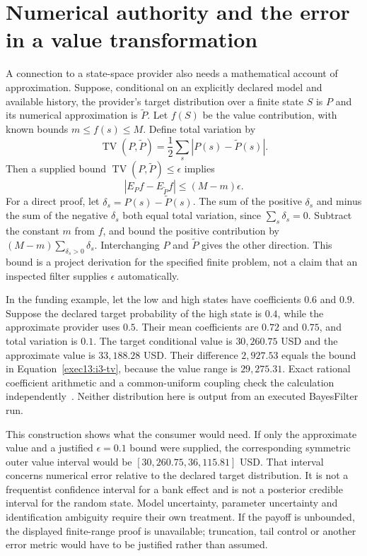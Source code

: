 \section{Numerical authority and the error in a value transformation}

A connection to a state-space provider also needs a mathematical account of
approximation. Suppose, conditional on an explicitly declared model and
available history, the provider's target distribution over a finite state
$S$ is $P$ and its numerical approximation is $\widetilde P$. Let $f(S)$
be the value contribution, with known bounds $m\leq f(s)\leq M$.
Define total variation by
\[
 \operatorname{TV}(P,\widetilde P)
     =\frac12\sum_s|P(s)-\widetilde P(s)|.
\]
Then a supplied bound $\operatorname{TV}(P,\widetilde P)\leq\epsilon$
implies
\begin{equation}
 |E_Pf-E_{\widetilde P}f|\leq(M-m)\epsilon.
 \label{exec13:i3-tv}
\end{equation}
For a direct proof, let $\delta_s=P(s)-\widetilde P(s)$. The sum of the
positive $\delta_s$ and minus the sum of the negative $\delta_s$ both
equal total variation, since $\sum_s\delta_s=0$. Subtract the constant
$m$ from $f$, and bound the positive contribution by
$(M-m)\sum_{\delta_s>0}\delta_s$. Interchanging $P$ and $\widetilde P$
gives the other direction. This bound is a project derivation for the
specified finite problem, not a claim that an inspected filter supplies
$\epsilon$ automatically.

In the funding example, let the low and high states have coefficients
$0.6$ and $0.9$. Suppose the declared target probability of the high state
is $0.4$, while the approximate provider uses $0.5$. Their mean
coefficients are $0.72$ and $0.75$, and total variation is $0.1$.
The target conditional value is $30{,}260.75$ USD and the approximate
value is $33{,}188.28$ USD. Their difference $2{,}927.53$ equals the
bound in Equation~\eqref{exec13:i3-tv}, because the value range is
$29{,}275.31$. Exact rational coefficient arithmetic and a common-uniform
coupling check the calculation independently~\citep{exec13_i3_approximation}.
Neither distribution here is output from an executed BayesFilter run.

This construction shows what the consumer would need. If only the
approximate value and a justified $\epsilon=0.1$ bound were supplied,
the corresponding symmetric outer value interval would be
$[30{,}260.75,36{,}115.81]$ USD. That interval concerns numerical error
relative to the declared target distribution. It is not a frequentist
confidence interval for a bank effect and is not a posterior credible
interval for the random state. Model uncertainty, parameter uncertainty
and identification ambiguity require their own treatment. If the payoff is
unbounded, the displayed finite-range proof is unavailable; truncation,
tail control or another error metric would have to be justified rather
than assumed.

